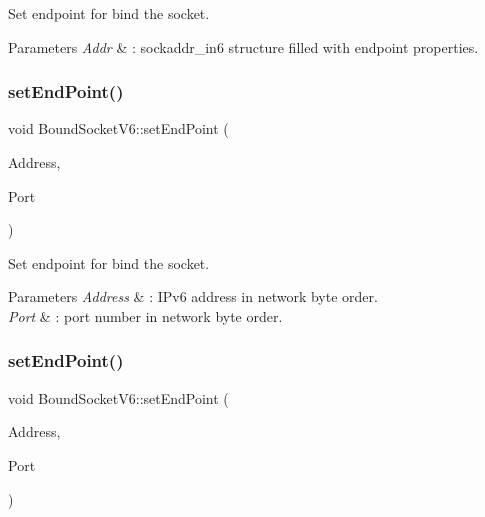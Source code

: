 Set endpoint for bind the socket. 
\begin{DoxyParams}{Parameters}
{\em Addr} & \+: sockaddr\+\_\+in6 structure filled with endpoint properties. \\
\hline
\end{DoxyParams}
\mbox{\label{classBoundSocketV6_a3bcb3acaa01f814957b5dc3233cdb0c9}} 
\subsubsection{\texorpdfstring{set\+End\+Point()}{setEndPoint()}\hspace{0.1cm}{\footnotesize\ttfamily [2/3]}}
{\footnotesize\ttfamily void Bound\+Socket\+V6\+::set\+End\+Point (\begin{DoxyParamCaption}\item[{in6\+\_\+addr}]{Address,  }\item[{short}]{Port }\end{DoxyParamCaption})\hspace{0.3cm}{\ttfamily [virtual]}}

Set endpoint for bind the socket. 
\begin{DoxyParams}{Parameters}
{\em Address} & \+: I\+Pv6 address in network byte order. \\
\hline
{\em Port} & \+: port number in network byte order. \\
\hline
\end{DoxyParams}
\mbox{\label{classBoundSocketV6_a183ca4435804e6d1ea616c8c74e26e46}} 
\subsubsection{\texorpdfstring{set\+End\+Point()}{setEndPoint()}\hspace{0.1cm}{\footnotesize\ttfamily [3/3]}}
{\footnotesize\ttfamily void Bound\+Socket\+V6\+::set\+End\+Point (\begin{DoxyParamCaption}\item[{const char $\ast$}]{Address,  }\item[{short}]{Port }\end{DoxyParamCaption})\hspace{0.3cm}{\ttfamily [virtual]}}

